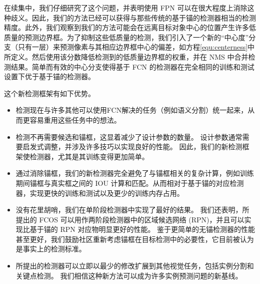 \documentclass[../main.tex]{subfile}
\begin{document}
在续集中，我们仔细研究了这个问题，并表明使用 FPN 可以在很大程度上消除这种歧义。因此，我们的方法已经可以获得与那些传统的基于锚的检测器相当的检测精度。此外，我们观察到我们的方法可能会在远离目标对象中心的位置产生许多低质量的预测边界框。为了抑制这些低质量的检测，我们引入了一个新的“中心度”分支（只有一层）来预测像素与其相应边界框中心的偏差，如方程\ref{equ:centerness}中所定义。然后使用该分数降低检测到的低质量边界框的权重，并在 NMS 中合并检测结果。简单而有效的中心分支使得基于 FCN 的检测器在完全相同的训练和测试设置下优于基于锚的检测器。

这个新检测框架有如下优势。

\begin{itemize}
    \item 检测现在与许多其他可以使用FCN解决的任务（例如语义分割）统一起来，从而更容易重用这些任务中的想法。
    \item 检测不再需要候选和锚框，这显着减少了设计参数的数量。 设计参数通常需要启发式调整，并涉及许多技巧以实现良好的性能。 因此，我们的新检测框架使检测器，尤其是其训练变得更加简单。
    \item 通过消除锚框，我们的新检测器完全避免了与锚框相关的复杂计算，例如训练期间锚框与真实框之间的 IOU 计算和匹配。从而相对于基于锚的对应检测器，实现更快的训练和测试以及更少的训练内存占用。
    \item 没有花里胡哨，我们在单阶段检测器中实现了最好的结果。 我们还表明，所提出的 FCOS 可以用作两阶段检测器中的区域候选网络 (RPN)，并且可以实现比基于锚的 RPN 对应物明显更好的性能。 鉴于更简单的无锚检测器的性能甚至更好，我们鼓励社区重新考虑锚框在目标检测中的必要性，它目前被认为是事实上的检测标准。
    \item 所提出的检测器可以立即以最少的修改扩展到其他视觉任务，包括实例分割和关键点检测。 我们相信这种新方法可以成为许多实例预测问题的新基线。
\end{itemize}
\end{document}
